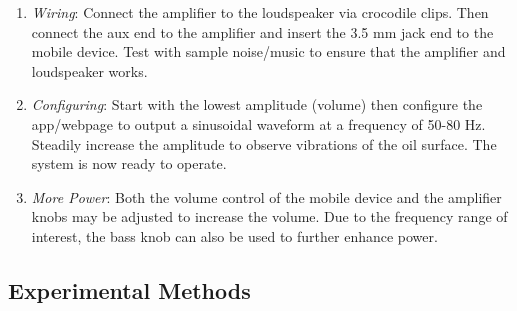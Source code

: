 \begin{enumerate}
\item  \textit{Wiring}: Connect the amplifier to the loudspeaker via crocodile clips. Then connect the aux end to the amplifier and insert the 3.5 mm jack end to the mobile device. Test with sample noise/music to ensure that the amplifier and loudspeaker works.

\item  \textit{Configuring}: Start with the lowest amplitude (volume) then configure the app/webpage to output a sinusoidal waveform at a frequency of 50-80 Hz. Steadily increase the amplitude to observe vibrations of the oil surface. The system is now ready to operate.

\item  \textit{More Power}: Both the volume control of the mobile device and the amplifier knobs may be adjusted to increase the volume. Due to the frequency range of interest, the bass knob can also be used to further enhance power.

\end{enumerate}


\subsection{Experimental Methods}

